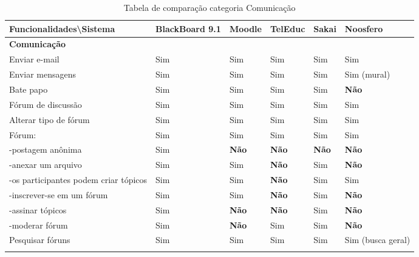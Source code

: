 \begin{landscape}
\begin{table}[H]
\begin{tabular}{|@{}p{5.5cm}|p{3.5cm}|p{3.5cm}|p{3.5cm}|p{3.5cm}|p{3.5cm}@{}|}
\hline
\textbf{Funcionalidades\textbackslash Sistema} & \textbf{BlackBoard 9.1} & \textbf{Moodle} & \textbf{TelEduc} & \textbf{Sakai} & \textbf{Noosfero}\\ \hline
\textbf{Comunicação} & & & & & \\
Enviar e-mail & Sim & Sim & Sim& Sim   & Sim    \\
Enviar mensagens& Sim & Sim & Sim& Sim   & Sim {\tiny(mural)}\\
Bate papo& Sim & Sim & Sim& Sim   & \textbf{Não}    \\
Fórum de discussão& Sim & Sim & Sim& Sim   & Sim    \\
Alterar tipo de fórum & Sim & Sim & Sim& Sim   & Sim \\
Fórum:   & Sim & Sim & Sim& Sim   & Sim    \\
-postagem anônima & Sim & \textbf{Não} & \textbf{Não}& \textbf{Não}   & \textbf{Não}    \\
-anexar um arquivo& Sim & Sim & \textbf{Não}& Sim   & \textbf{Não}    \\
-os participantes podem criar tópicos   & Sim & Sim & \textbf{Não}& Sim   & Sim    \\
-inscrever-se em um fórum  & Sim & Sim & \textbf{Não}& Sim   & \textbf{Não}    \\
-assinar tópicos& Sim & \textbf{Não} & \textbf{Não}& Sim   & \textbf{Não}     \\
-moderar fórum& Sim & \textbf{Não}  & Sim& Sim   & \textbf{Não}     \\
Pesquisar fóruns& Sim & Sim & Sim& Sim   & Sim {\tiny (busca geral)} \\
 & & & & & \\ \hline
\end{tabular}
\caption{Tabela de comparação categoria Comunicação}
\label{tab:comunicacao}
\end{table}


\end{landscape}
